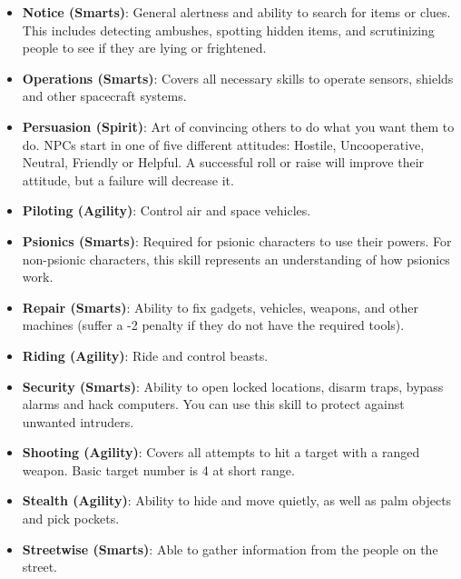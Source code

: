 \documentclass[10pt,twoside]{article}
\begin{document}
\begin{multicols}{2}
\begin{itemize}
            \item \textbf{Notice (Smarts)}: General alertness and ability to search for items or clues. This includes detecting ambushes, spotting hidden items, and scrutinizing people to see if they are lying or frightened.

            \item \textbf{Operations (Smarts)}: Covers all necessary skills to operate sensors, shields and other spacecraft systems.

            \item \textbf{Persuasion (Spirit)}: Art of convincing others to do what you want them to do. NPCs start in one of five different attitudes: Hostile, Uncooperative, Neutral, Friendly or Helpful. A successful roll or raise will improve their attitude, but a failure will decrease it.

            \item \textbf{Piloting (Agility)}: Control air and space vehicles.

            \item \textbf{Psionics (Smarts)}: Required for psionic characters to use their powers. For non-psionic characters, this skill represents an understanding of how psionics work.

            \item \textbf{Repair (Smarts)}: Ability to fix gadgets, vehicles, weapons, and other machines (suffer a -2 penalty if they do not have the required tools).

            \item \textbf{Riding (Agility)}: Ride and control beasts.

            \item \textbf{Security (Smarts)}: Ability to open locked locations, disarm traps, bypass alarms and hack computers. You can use this skill to protect against unwanted intruders.

            \item \textbf{Shooting (Agility)}: Covers all attempts to hit a target with a ranged weapon. Basic target number is 4 at short range.

            \item \textbf{Stealth (Agility)}: Ability to hide and move quietly, as well as palm objects and pick pockets.

            \item \textbf{Streetwise (Smarts)}: Able to gather information from the people on the street.


\end{itemize}
\end{multicols}
\end{document}
